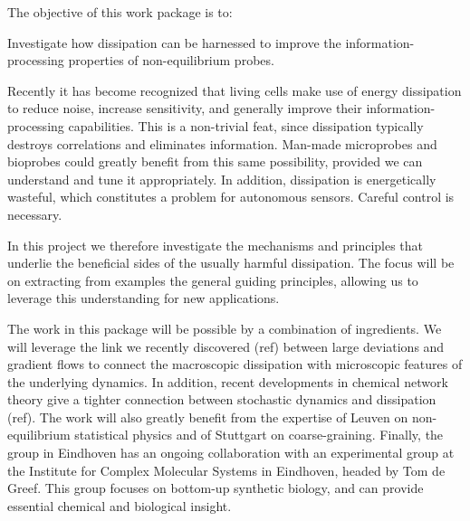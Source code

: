 \begin{workpackage}[id=WPkinetic,wphases=0-48,
short=Dissipation,
title=Harnessing dissipation,
lead=TUE,
TUERM=36]

\begin{wpobjectives}
The objective of this work package is to:
\begin{compactitem}
\item Investigate how dissipation can be harnessed to improve the information-processing properties of non-equilibrium probes.
\end{compactitem}
\end{wpobjectives}

\begin{wpdescription}
Recently it has become recognized that living cells make use of energy dissipation to reduce noise, increase sensitivity, and generally improve their information-processing capabilities. This is a non-trivial feat, since dissipation typically destroys correlations and eliminates information. Man-made microprobes and bioprobes could greatly benefit from this same possibility, provided we can understand and tune it appropriately. In addition, dissipation is energetically wasteful, which constitutes a problem for autonomous sensors. Careful control is necessary. 

In this project we therefore investigate the mechanisms and principles that underlie the beneficial sides of the usually harmful dissipation. The focus will be on extracting from examples the general guiding principles, allowing us to leverage this understanding for new applications.

The work in this package will be possible by a combination of ingredients. We will leverage the link we recently discovered (ref) between large deviations and gradient flows to connect the macroscopic dissipation with microscopic features of the underlying dynamics. In addition, recent developments in chemical network theory give a tighter connection between stochastic dynamics and dissipation (ref). The work will also greatly benefit from the expertise of Leuven on non-equilibrium statistical physics and of Stuttgart on coarse-graining. 
Finally, the group in Eindhoven has an ongoing collaboration with an experimental group at the Institute for Complex Molecular Systems in Eindhoven, headed by Tom de Greef. This group focuses on bottom-up synthetic biology, and can provide essential chemical and biological insight. 


\end{wpdescription}
\end{workpackage}
